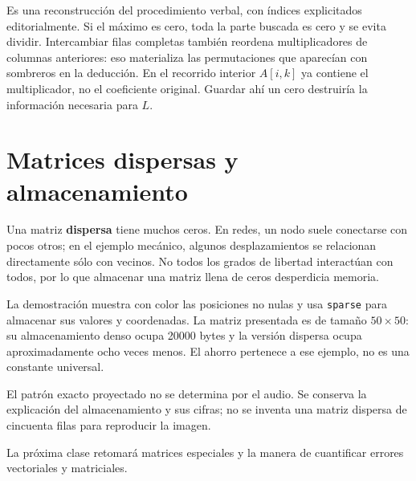 \documentclass[12pt,a4paper]{article}
\begin{document}
Es una reconstrucción del procedimiento verbal, con índices explicitados editorialmente. Si el máximo es cero, toda la parte buscada es cero y se evita dividir. Intercambiar filas completas también reordena multiplicadores de columnas anteriores: eso materializa las permutaciones que aparecían con sombreros en la deducción. En el recorrido interior $A[i,k]$ ya contiene el multiplicador, no el coeficiente original. Guardar ahí un cero destruiría la información necesaria para $L$.

\section{Matrices dispersas y almacenamiento}

Una matriz \textbf{dispersa} tiene muchos ceros. En redes, un nodo suele conectarse con pocos otros; en el ejemplo mecánico, algunos desplazamientos se relacionan directamente sólo con vecinos. No todos los grados de libertad interactúan con todos, por lo que almacenar una matriz llena de ceros desperdicia memoria.

La demostración muestra con color las posiciones no nulas y usa \texttt{sparse} para almacenar sus valores y coordenadas. La matriz presentada es de tamaño $50\times50$: su almacenamiento denso ocupa 20000 bytes y la versión dispersa ocupa aproximadamente ocho veces menos. El ahorro pertenece a ese ejemplo, no es una constante universal.

\begin{notebox}
El patrón exacto proyectado no se determina por el audio. Se conserva la explicación del almacenamiento y sus cifras; no se inventa una matriz dispersa de cincuenta filas para reproducir la imagen.
\end{notebox}

La próxima clase retomará matrices especiales y la manera de cuantificar errores vectoriales y matriciales.
\end{document}
